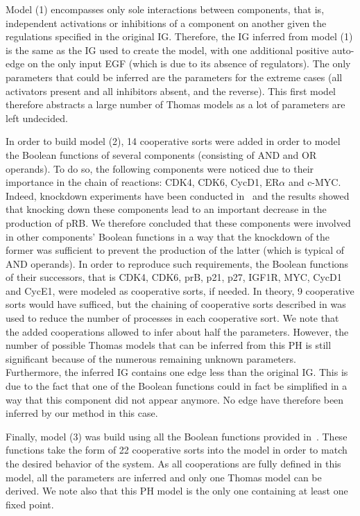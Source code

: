 {Model (1) encompasses only sole interactions between components, that is,
independent activations or inhibitions of a component on another given the regulations specified in the original IG.
Therefore, the IG inferred from model (1) is the same as the IG used to create the model,
with one additional positive auto-edge on the only input EGF (which is due to its absence of regulators).
The only parameters that could be inferred are the parameters for the extreme cases
(all activators present and all inhibitors absent, and the reverse).
This first model therefore abstracts a large number of Thomas models as a lot of parameters are left undecided.

In order to build model (2), 14 cooperative sorts were added in order to model the Boolean functions of several components
(consisting of AND and OR operands).
To do so, the following components were noticed due to their importance in the chain of reactions:
CDK4, CDK6, CycD1, ER$\alpha$ and c-MYC.
Indeed, knockdown experiments have been conducted in~\cite{Sahin09}
and the results showed that knocking down these components lead to an important decrease in the production of pRB.
We therefore concluded that these components were involved in other components' Boolean functions
in a way that the knockdown of the former was sufficient to prevent the production of the latter (which is typical of AND operands).
In order to reproduce such requirements, the Boolean functions of their successors,
that is CDK4, CDK6, prB, p21, p27, IGF1R, MYC, CycD1 and CycE1,
were modeled as cooperative sorts, if needed.
In theory, 9 cooperative sorts would have sufficed, but the chaining of cooperative sorts described
in  was used to reduce the number of processes in each cooperative sort.
We note that the added cooperations allowed to infer about half the parameters.
However, the number of possible Thomas models that can be inferred from this PH is still significant
because of the numerous remaining unknown parameters.
Furthermore, the inferred IG contains one edge less than the original IG. This is due to the fact that
one of the Boolean functions could in fact be simplified in a way that this component did not appear anymore.
No edge have therefore been inferred by our method in this case.

Finally, model (3) was build using all the Boolean functions provided in~\cite{Sahin09}.
These functions take the form of 22 cooperative sorts into the model in order to match the desired behavior of the system.
As all cooperations are fully defined in this model, all the parameters are inferred and only one Thomas model can be derived.
We note also that this PH model is the only one containing at least one fixed point.



}
